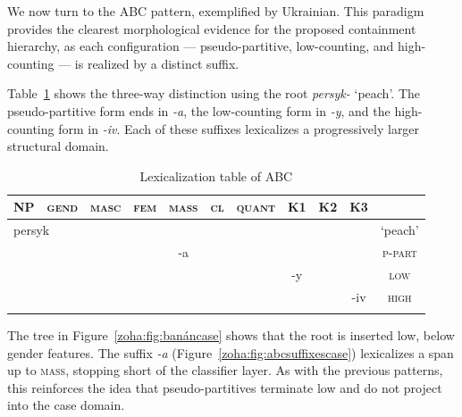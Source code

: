 \documentclass[output=paper,colorlinks,citecolor=brown
]{langscibook}
\begin{document}
We now turn to the ABC pattern, exemplified by Ukrainian. This paradigm provides the clearest morphological evidence for the proposed containment hierarchy, as each configuration — pseudo-partitive, low-counting, and high-counting — is realized by a distinct suffix.

Table~\ref{zoha:tab:lexABCcase} shows the three-way distinction using the root \textit{persyk-} ‘peach’. The pseudo-partitive form ends in \textit{-a}, the low-counting form in \textit{-y}, and the high-counting form in \textit{-iv}. Each of these suffixes lexicalizes a progressively larger structural domain.

\begin{table}
\begin{tabularx}{0.95\textwidth}{ccccccccccc}
\lsptoprule
\textsc{NP}&{\textsc{gend}} & {\textsc{masc}} & {\textsc{fem}} & {\textsc{mass}} & {\textsc{cl}} & {\textsc{quant}} & {\textsc{K1}} & {\textsc{K2}} & {\textsc{K3}}\\
\midrule
\multicolumn{2}{l}{\cellcolor[gray]{0.9}persyk} & {\cellcolor[gray]{0.9}} & {\cellcolor{black}} & {} & {} & {} & {} & {} & {} & {`peach'}\\[.5ex]
\cellcolor[gray]{0.9} & {\cellcolor[gray]{0.9}} & {\cellcolor[gray]{0.8}} & {\cellcolor{black}} & {\cellcolor[gray]{0.8}-a} & {} & {} & {} & {} & {} & {\textsc{p-part}}\\[.5ex]
\cellcolor[gray]{0.9} & {\cellcolor[gray]{0.9}} & {\cellcolor[gray]{0.7}} & {\cellcolor{black}} & {\cellcolor[gray]{0.7}} & {\cellcolor[gray]{0.7}} & {\cellcolor{black}} & {\cellcolor[gray]{0.7}-y} & {} & {} & {\textsc{low}} \\[.5ex]
\cellcolor[gray]{0.9} & {\cellcolor[gray]{0.9}} & {\cellcolor[gray]{0.6}} & {\cellcolor{black}} & {\cellcolor[gray]{0.6}} & {\cellcolor[gray]{0.6}} & {\cellcolor[gray]{0.6}} & {\cellcolor[gray]{0.6}} & {\cellcolor[gray]{0.6}} & {\cellcolor[gray]{0.6}-iv} & {\textsc{high}} \\[.5ex]
\lspbottomrule
\end{tabularx}
\caption{Lexicalization table of ABC}
\label{zoha:tab:lexABCcase}
\end{table}

The tree in Figure~\ref{zoha:fig:banáncase} shows that the root is inserted low, below gender features. The suffix \textit{-a} (Figure~\ref{zoha:fig:abcsuffixescase}) lexicalizes a span up to \textsc{mass}, stopping short of the classifier layer. As with the previous patterns, this reinforces the idea that pseudo-partitives terminate low and do not project into the case domain.
\end{document}

